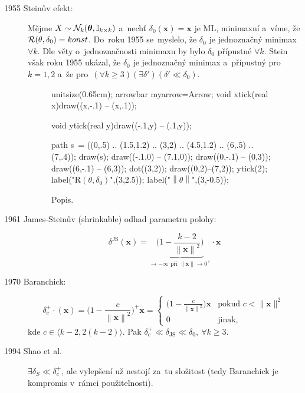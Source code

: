 \begin{description}
	\item[1955 Steinův efekt:] Mějme $X\sim \mathcal{N}_k(\boldsymbol{\theta},\mathbb{I}_{k\times k})$ a~nechť $\delta_0(\textbf{x})=\textbf{x}$ je ML, minimaxní a~víme, že $\mathcal{R}(\theta,\delta_0)=konst$. Do~roku 1955 se~myslelo, že $\delta_0$ je jednoznačný minimax $\forall k$. Dle věty o~jednoznačnosti minimaxu by bylo $\delta_0$  přípustné $\forall k$. Stein však roku 1955 ukázal, že $\delta_0$ je jednoznačný minimax a~přípustný pro~$k=1,2$ a~že pro~$(\forall k\geq3)(\exists\delta')(\delta'\ll\delta_0)$.
	  \begin{figure}[h]
		\centering
		\begin{asy}
		unitsize(0.65cm);
		arrowbar myarrow=Arrow;
		void xtick(real x){draw((x,-.1) -- (x,.1));}
		
		void ytick(real y){draw((-.1,y) -- (.1,y));}
		
		path s~= ((0,.5) .. (1.5,1.2) .. (3,2) .. (4.5,1.2) .. (6,.5) .. (7,.4));
		draw(s);
		draw((-.1,0) -- (7.1,0));
		draw((0,-.1) -- (0,3));
		draw((6,-.1) -- (6,3));
		dot((3,2));
		draw((0,2)--(7,2));
		ytick(2);
		label("$\mathrm{R}(\theta,\delta_0)$",(3,2.5));
		label("$\left\|\theta\right\|$",(3,-0.5));
		\end{asy}
		\caption{Popis.}\label{pic2}
	\end{figure}
	\FloatBarrier
	\item[1961 James-Steinův (shrinkable) odhad parametru polohy:]$$ \delta^\mathrm{JS}(\textbf{x})=\underbrace{\Big(1-\frac{k-2}{\left\|\textbf{x}\right\|^2}\Big)}_{\to-\infty\text{ při~}\left\|\textbf{x}\right\|\to0^+}\cdot\textbf{x} $$
	\item[1970 Baranchick:] $$ \delta_c^+\cdot(\textbf{x})=\Big(1-\frac{c}{\left\|\textbf{x}\right\|^2}\Big)^+\textbf{x}=\begin{cases}
	\big(1-\frac{c}{\left\|\textbf{x}\right\|^2}\big)\textbf{x} & \text{pokud }c<\|\textbf{x}\|^2 \\0 & \text{jinak,}
	\end{cases} $$
	kde $c\in\langle k-2,2(k-2)\rangle$. Pak $\delta_c^+\ll \delta_\mathrm{JS} \ll \delta_0,~\forall k\geq 3$.
	\item[1994 Shao et al.] $\exists \delta_S \ll \delta_c^+$, ale vylepšení už nestojí za~tu složitost (tedy Baranchick je kompromis v~rámci použitelnosti).
\end{description}
